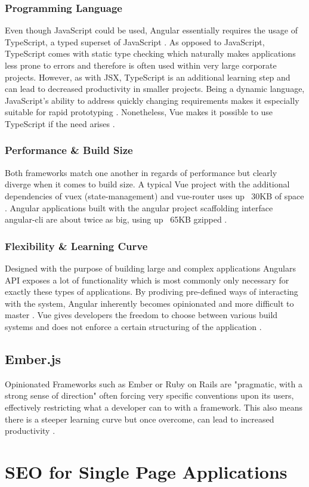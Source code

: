 \subsubsection{Programming Language}
Even though JavaScript could be used, Angular essentially requires the usage of TypeScript, a typed superset of JavaScript \cite{TypeScript:online}. As opposed to JavaScript, TypeScript comes with static type checking which naturally makes applications less prone to errors \cite{DynamicallyTypedLanguages:proceedings} and therefore is often used within very large corporate projects. However, as with JSX, TypeScript is an additional learning step and can lead to decreased productivity in smaller projects. Being a dynamic language, JavaScript's ability to address quickly changing requirements makes it especially suitable for rapid prototyping \cite[p.~72]{DynamicallyTypedLanguages:proceedings}. Nonetheless, Vue makes it possible to use TypeScript if the need arises \cite{VueTypeScript:online}.

\subsubsection{Performance \& Build Size}
Both frameworks match one another in regards of performance but clearly diverge when it comes to build size. A typical Vue project with the additional dependencies of vuex (state-management) and vue-router uses up ~30KB of space \cite{ComparisonVue:online}. Angular applications built with the angular project scaffolding interface angular-cli are about twice as big, using up ~65KB gzipped \cite{ComparisonVue:online}.

\subsubsection{Flexibility \& Learning Curve}
Designed with the purpose of building large and complex applications Angulars API exposes a lot of functionality which is most commonly only necessary for exactly these types of applications. By prodiving pre-defined ways of interacting with the system, Angular inherently becomes opinionated and more difficult to master \cite{ComparisonVue:online}. Vue gives developers the freedom to choose between various build systems and does not enforce a certain structuring of the application \cite{ComparisonVue:online}. 

\subsection{Ember.js}
Opinionated Frameworks such as Ember or Ruby on Rails are "pragmatic, with a strong sense of direction" \cite{Bedell:Opinionated:article} often forcing very specific conventions upon its users, effectively restricting what a developer can to with a framework. This also means there is a steeper learning curve but once overcome, can lead to increased productivity \cite{ComparisonVue:online}.


\section{SEO for Single Page Applications}
